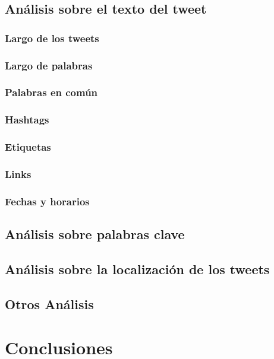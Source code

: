\documentclass[12pt,a4paper,draft]{article}
\begin{document}
\subsection{Análisis sobre el texto del tweet}

\subsubsection{Largo de los tweets}

\subsubsection{Largo de palabras}

\subsubsection{Palabras en común}

\subsubsection{Hashtags}

\subsubsection{Etiquetas}

\subsubsection{Links}

\subsubsection{Fechas y horarios}

\subsection{Análisis sobre palabras clave}

\subsection{Análisis sobre la localización de los tweets}

\subsection{Otros Análisis}

\section{Conclusiones}
\end{document}
